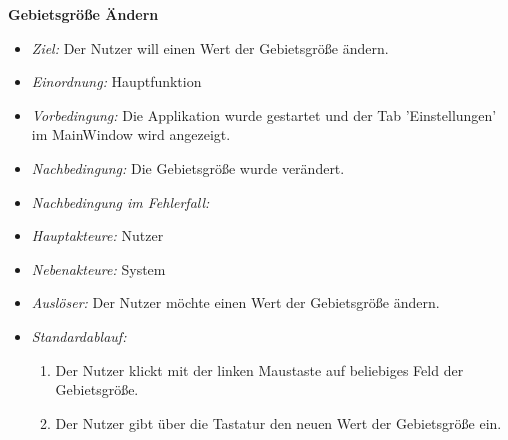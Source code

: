 \textbf{Gebietsgr\"o\ss e \"Andern}
  \begin{itemize}
  \item \textit{Ziel:} Der Nutzer will einen Wert der Gebietsgr\"o\ss e \"andern.
  \item \textit{Einordnung:} Hauptfunktion
  \item \textit{Vorbedingung:} Die Applikation wurde gestartet und der Tab 'Einstellungen' im MainWindow wird angezeigt.
  \item \textit{Nachbedingung:} Die Gebietsgr\"o\ss e wurde ver\"andert.
  \item \textit{Nachbedingung im Fehlerfall:} 
  \item \textit{Hauptakteure:} Nutzer
  \item \textit{Nebenakteure:} System
  \item \textit{Ausl\"oser:} Der Nutzer m\"ochte einen Wert der Gebietsgr\"o\ss e \"andern.
  \item \textit{Standardablauf:}
    \begin{enumerate}
    \item Der Nutzer klickt mit der linken Maustaste auf beliebiges Feld der Gebietsgr\"o\ss e.
    \item Der Nutzer gibt \"uber die Tastatur den neuen Wert der Gebietsgr\"o\ss e ein.
  \end{enumerate}
  \end{itemize}